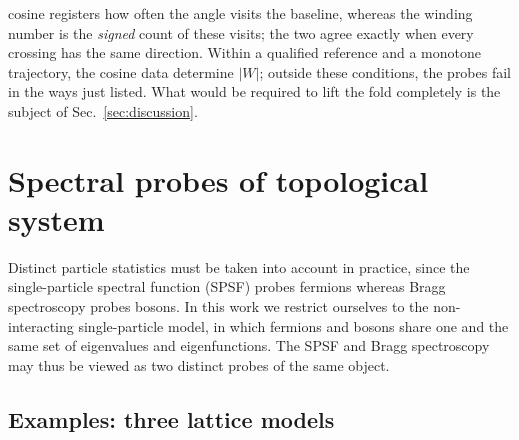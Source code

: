 \documentclass[onecolumn,aps,prl,superscriptaddress,longbibliography]{revtex4-2}
\begin{document}
cosine registers how often the angle visits the baseline, whereas the winding number is the \emph{signed} count of these visits; the two agree exactly when every crossing has the same direction. Within a qualified reference and a monotone trajectory, the cosine data determine $|W|$; outside these conditions, the probes fail in the ways just listed. What would be required to lift the fold completely is the subject of Sec.~\ref{sec:discussion}.



\section{Spectral probes of topological system}\label{sec:topo_probes}
Distinct particle statistics must be taken into account in practice, since the single-particle spectral function (SPSF) probes fermions whereas Bragg spectroscopy probes bosons. In this work we restrict ourselves to the non-interacting single-particle model, in which fermions and bosons share one and the same set of eigenvalues and eigenfunctions. The SPSF and Bragg spectroscopy may thus be viewed as two distinct probes of the same object.


\subsection{Examples: three lattice models}\label{subsec:examples}
\end{document}
